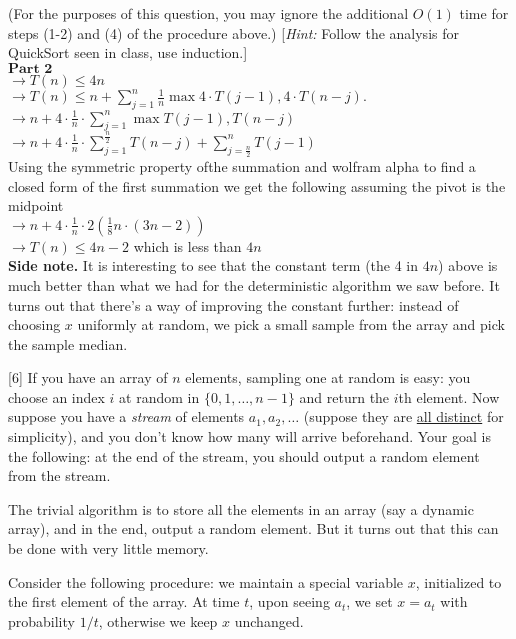 \documentclass[addpoints, 11pt]{exam}
\begin{document}
\begin{questions}
  (For the purposes of this question, you may ignore the additional $O(1)$ time for steps (1-2) and (4) of the procedure above.) [{\em Hint:} Follow the analysis for QuickSort seen in class, use induction.] \\
  $\textbf{Part 2}$ \\
  $\rightarrow T(n) \leq 4n$ \\
  $\rightarrow T(n) \le n + \sum_{j=1}^n \frac{1}{n} \max { 4\cdot T(j-1), 4\cdot T(n-j)}. $ \\
  $\rightarrow n + 4 \cdot \frac{1}{n} \cdot \sum_{j=1}^n \max { T(j-1), T(n-j)}$ \\
  $\rightarrow n + 4 \cdot \frac{1}{n} \cdot \sum_{j=1}^\frac{n}{2}T(n - j) + \sum_{j=\frac{n}{2}}^nT(j - 1)$ \\
  Using the symmetric property ofthe summation and wolfram alpha to find a closed form of the first summation we get the following assuming the pivot is the midpoint \\
  $\rightarrow n + 4 \cdot \frac{1}{n} \cdot 2(\frac{1}{8} n \cdot (3n - 2))$ \\
  $\rightarrow T(n) \leq 4n - 2$ which is less than $4n$ \\

  {\bf Side note.} It is interesting to see that the constant term (the 4 in $4n$) above is much better than what we had for the deterministic algorithm we saw before. It turns out that there's a way of improving the constant further: instead of choosing $x$ uniformly at random, we pick a small sample from the array and pick the sample median.

  [6]
  If you have an array of $n$ elements, sampling one at random is easy: you choose an index $i$ at random in $\{0,1, \dots, n-1\}$ and return the $i$th element. Now suppose you have a {\em stream} of elements $a_1, a_2, \dots$ (suppose they are \underline{all distinct} for simplicity), and you don't know how many will arrive beforehand. Your goal is the following: at the end of the stream, you should output a random element from the stream.

  The trivial algorithm is to store all the elements in an array (say a dynamic array), and in the end, output a random element. But it turns out that this can be done with very little memory.

  Consider the following procedure: we maintain a special variable $x$, initialized to the first element of the array. At time $t$, upon seeing $a_t$, we set $x = a_t$ with probability $1/t$, otherwise we keep $x$ unchanged.


\end{questions}
\end{document}
